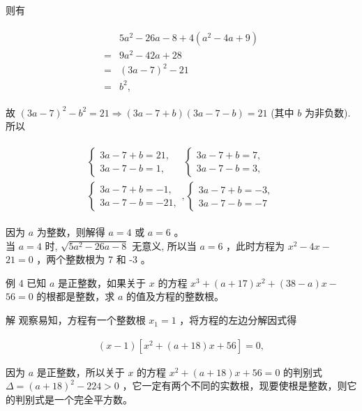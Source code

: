 \documentclass[10pt]{article}
\begin{document}
则有

\begin{align*}
\begin{aligned}
& 5 a^{2}-26 a-8+4\left(a^{2}-4 a+9\right) \\
= & 9 a^{2}-42 a+28 \\
= & (3 a-7)^{2}-21 \\
= & b^{2},
\end{aligned}
\end{align*}

故 $(3 a-7)^{2}-b^{2}=21 \Rightarrow(3 a-7+b)(3 a-7-b)=21$ (其中 $b$ 为非负数).\\
所以

\begin{align*}
\begin{gathered}
\left\{\begin{array} { l } 
{ 3 a - 7 + b = 2 1 , } \\
{ 3 a - 7 - b = 1 , }
\end{array} \quad \left\{\begin{array}{l}
3 a-7+b=7, \\
3 a-7-b=3,
\end{array}\right.\right. \\
\left\{\begin{array}{l}
3 a-7+b=-1, \\
3 a-7-b=-21,
\end{array},\left\{\begin{array}{l}
3 a-7+b=-3, \\
3 a-7-b=-7
\end{array}\right.\right.
\end{gathered}
\end{align*}

因为 $a$ 为整数，则解得 $a=4$ 或 $a=6$ 。\\
当 $a=4$ 时, $\sqrt{5 a^{2}-26 a-8}$ 无意义, 所以当 $a=6$ ，此时方程为 $x^{2}-4 x-$ $21=0$ ，两个整数根为 7 和 -3 。

例 4 已知 $a$ 是正整数，如果关于 $x$ 的方程 $x^{3}+(a+17) x^{2}+(38-a) x-$ $56=0$ 的根都是整数，求 $a$ 的值及方程的整数根。

解 观察易知，方程有一个整数根 $x_{1}=1$ ，将方程的左边分解因式得

\begin{align*}
(x-1)\left[x^{2}+(a+18) x+56\right]=0,
\end{align*}

因为 $a$ 是正整数，所以关于 $x$ 的方程 $x^{2}+(a+18) x+56=0$ 的判别式\\
$\Delta=(a+18)^{2}-224>0$ ，它一定有两个不同的实数根，现要使根是整数，则它的判别式是一个完全平方数。
\end{document}
